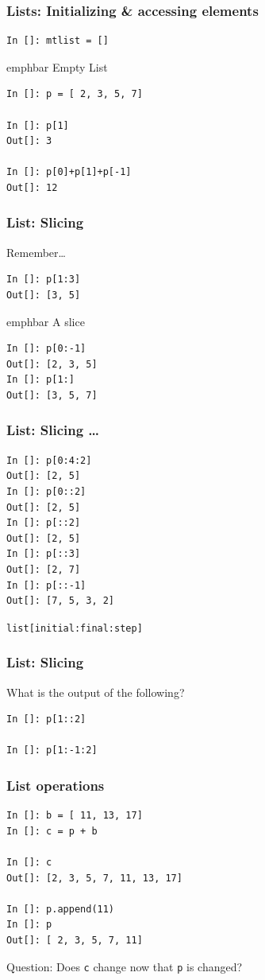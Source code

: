 \documentclass[14pt,compress]{beamer}
\newcommand{\emphbar}[1]
{\begin{beamercolorbox}[rounded=true]{emphbar}
      {#1}
 \end{beamercolorbox}
}
\newcounter{time}
\newcommand{\inctime}[1]{\addtocounter{time}{#1}{\tiny \thetime\ m}}
\newcommand{\typ}[1]{\lstinline{#1}}
\newcommand{\kwrd}[1]{ \texttt{\textbf{\color{blue}{#1}}}  }
\begin{document}
\begin{frame}[fragile]
\frametitle{Lists: Initializing \& accessing elements}
\begin{lstlisting}
In []: mtlist = []
\end{lstlisting}
\emphbar{Empty List}
\begin{lstlisting}
In []: p = [ 2, 3, 5, 7]

In []: p[1]
Out[]: 3

In []: p[0]+p[1]+p[-1]
Out[]: 12
\end{lstlisting}
\end{frame}

\begin{frame}[fragile]
  \frametitle{List: Slicing}
  \begin{block}{Remember\ldots}
	\kwrd{In []: p = [ 2, 3, 5, 7]}
  \end{block}
\begin{lstlisting}
In []: p[1:3]
Out[]: [3, 5]
\end{lstlisting}
\emphbar{A slice}
\begin{lstlisting}
In []: p[0:-1]
Out[]: [2, 3, 5]
In []: p[1:]
Out[]: [3, 5, 7]
\end{lstlisting}
\end{frame}

\begin{frame}[fragile]
  \frametitle{List: Slicing \ldots}
\begin{lstlisting}
In []: p[0:4:2]
Out[]: [2, 5]
In []: p[0::2]
Out[]: [2, 5]
In []: p[::2]
Out[]: [2, 5]
In []: p[::3]
Out[]: [2, 7]
In []: p[::-1]
Out[]: [7, 5, 3, 2]
\end{lstlisting}
\alert{\typ{list[initial:final:step]}}
\end{frame}

\begin{frame}[fragile]
  \frametitle{List: Slicing}
  What is the output of the following?
\begin{lstlisting}
In []: p[1::2]

In []: p[1:-1:2]
\end{lstlisting}
\end{frame}


\begin{frame}[fragile]
\frametitle{List operations}
\begin{lstlisting}
In []: b = [ 11, 13, 17]
In []: c = p + b

In []: c
Out[]: [2, 3, 5, 7, 11, 13, 17]

In []: p.append(11)
In []: p
Out[]: [ 2, 3, 5, 7, 11]
\end{lstlisting}
Question: Does \typ{c} change now that \typ{p} is changed?
\inctime{10}
\end{frame}
\end{document}
